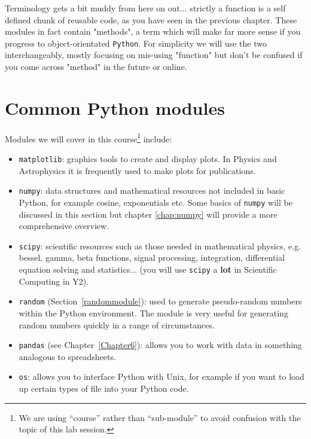 \begin{tcolorbox}[colback=red!5!white,colframe=red!75!black]
Terminology gets a bit muddy from here on out... strictly a function is a self defined chunk of reusable code, as you have seen in the previous chapter. These modules in fact contain "methods", a term which will make far more sense if you progress to object-orientated \texttt{Python}. For simplicity we will use the two interchangeably, mostly focusing on mis-using "function" but don't be confused if you come across "method" in the future or online.
\end{tcolorbox}

\section{Common Python modules}

Modules we will cover in this course\footnote{We are using ``course'' rather than ``sub-module'' to avoid confusion with the topic of this lab session.} include: 
\begin{itemize}
\item {\tt matplotlib}: graphics tools to create and display plots. In Physics and Astrophysics it is frequently used to make plots for publications.
\item {\tt numpy}: data structures and mathematical resources not included in basic Python, for example cosine, exponentials etc. Some basics of {\tt numpy} will be discussed in this section but chapter \ref{chap:numpy} will provide a more comprehensive overview. 
\item  {\tt scipy}: scientific resources such as those needed in mathematical physics, e.g. bessel, gamma, beta functions, signal processing, integration, differential equation solving and statistics... (you will use {\tt scipy} a {\bf lot} in Scientific Computing in Y2).
\item  {\tt random} (Section~\ref{randommodule}): used to generate pseudo-random numbers within the Python environment. The module is very useful for generating random numbers quickly in a range of circumstances.
\item  {\tt pandas} (see Chapter~\ref{Chapter6}): allows you to work with data in something analogous to spreadsheets.
\item  {\tt os}: allows you to interface Python with Unix, for example if you want to load up certain types of file into your Python code.
\end{itemize}

